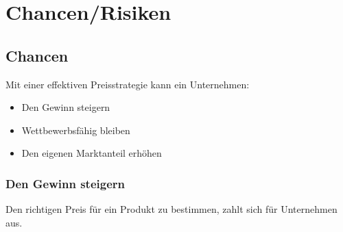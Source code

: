 %
%
%
%
%
\chapter{Chancen/Risiken}
\section{Chancen}
Mit einer effektiven Preisstrategie kann ein Unternehmen:
\begin{itemize}
  \item Den Gewinn steigern
  \item Wettbewerbsfähig bleiben
  \item Den eigenen Marktanteil erhöhen
\end{itemize}

\subsection{Den Gewinn steigern}
Den richtigen Preis für ein Produkt zu bestimmen, zahlt sich für Unternehmen aus. 

